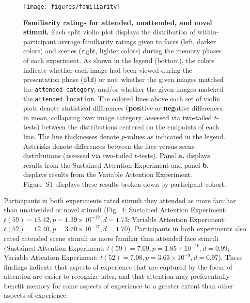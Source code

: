 \documentclass[english]{article}
\newcommand{\familiarity}{S1}
\begin{document}
\begin{figure}[tp]
  \centering
  \texttt{[image: figures/familiarity]}

  \caption{\textbf{Familiarity ratings for attended, unattended, and novel
  stimuli.} Each split violin plot displays the distribution of
  within-participant average familiarity ratings given to faces (left, darker
  colors) and scenes (right, lighter colors) during the memory phases of each
  experiment. As shown in the legend (bottom), the colors indicate whether each
  image had been viewed during the presentation phase (\texttt{old}) or not;
  whether the given images matched the \texttt{attended category}; and/or
  whether the given images matched the \texttt{attended location}. The colored
  lines above each set of violin plots denote statistical differences
  (\textbf{pos}itive or \textbf{neg}ative differences in mean, collapsing over
  image category, assessed via two-tailed $t$-tests) between the distributions
  centered on the endpoints of each line. The line thicknesses denote
  $p$-values as indicated in the legend. Asterisks denote differences between
  the face versus scene distributions (assessed via two-tailed $t$-tests).
  Panel \textbf{a.} displays results from the Sustained Attention Experiment
  and panel \textbf{b.} displays results from the Variable Attention
  Experiment. Figure~\familiarity~displays these results broken down by
  participant cohort.}

\label{fig:familiarity}
\end{figure}

Participants in both experiments rated stimuli they attended as more familiar
than unattended or novel stimuli (Fig.~\ref{fig:familiarity}; Sustained
Attention Experiment: $t(59) = 13.42, p = 1.39 \times 10^{-19}, d = 1.73$;
Variable Attention Experiment: $t(52) = 12.40, p = 3.70 \times 10^{-17}, d =
1.70$). Participants in both experiments also rated attended scene stimuli as
more familiar than attended face stimuli (Sustained Attention Experiment:
$t(59) = 7.69, p = 1.85 \times 10^{-10}, d = 0.99$; Variable Attention
Experiment: $t(52) = 7.08, p = 3.63 \times 10^{-9}, d = 0.97$). These findings
indicate that aspects of experience that are captured by the focus of attention
are easier to recognize later, and that attention may preferentially benefit
memory for some aspects of experience to a greater extent than other aspects of
experience.
\end{document}
